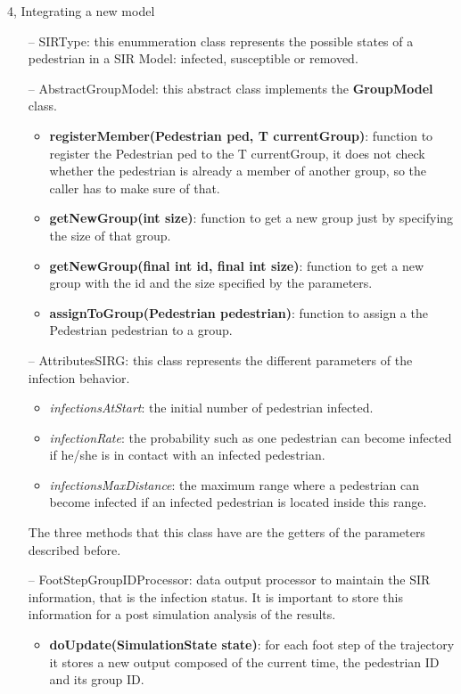 \documentclass[10pt,a4paper]{article}
\begin{document}
\begin{task}{4, Integrating a new model}
\begin{itemize}
\item[--] SIRType: this enummeration class represents the possible states of a pedestrian in a SIR Model: infected, susceptible or removed.

\item[--] AbstractGroupModel: this abstract class implements the \textbf{GroupModel} class.
    \begin{itemize}
        \item \textbf{registerMember(Pedestrian ped, T currentGroup)}: function to register the Pedestrian ped to the T currentGroup, it does not check whether the pedestrian is already a member of another group, so the caller has to make sure of that.
        \item \textbf{getNewGroup(int size)}: function to get a new group just by specifying the size of that group.
        \item \textbf{getNewGroup(final int id, final int size)}: function to get a new group with the id and the size specified by the parameters.
        \item \textbf{assignToGroup(Pedestrian pedestrian)}: function to assign a the Pedestrian pedestrian to a group.
    \end{itemize}

\item[--] AttributesSIRG: this class represents the different parameters of the infection behavior. 
    \begin{itemize}
        \item \textit{infectionsAtStart}: the initial number of pedestrian infected.
        \item \textit{infectionRate}: the probability such as one pedestrian can become infected if he/she is in contact with an infected pedestrian.
        \item \textit{infectionsMaxDistance}: the maximum range where a pedestrian can become infected if an infected pedestrian is located inside this range.
    \end{itemize}
    The three methods that this class have are the getters of the parameters described before. 

\item[--] FootStepGroupIDProcessor: data output processor to maintain the SIR information, that is the infection status. It is important to store this information for a post simulation analysis of the results.
    \begin{itemize}
        \item \textbf{doUpdate(SimulationState state)}: for each foot step of the trajectory it stores a new output composed of the current time, the pedestrian ID and its group ID.
    \end{itemize}


\end{itemize}
\end{task}
\end{document}
